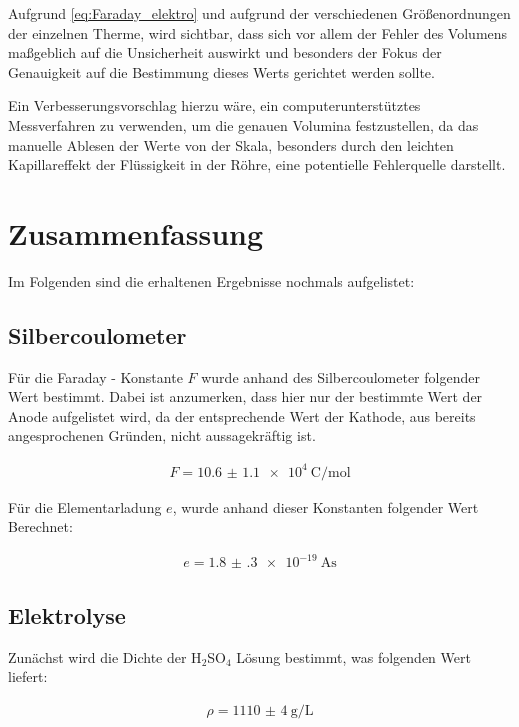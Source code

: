 \documentclass[11pt,ngerman]{scrartcl}
\begin{document}
\vspace{2mm}

Aufgrund \autoref{eq:Faraday_elektro} und aufgrund der verschiedenen Größenordnungen der einzelnen Therme, wird sichtbar, dass sich vor allem der Fehler des Volumens maßgeblich auf die Unsicherheit auswirkt und besonders der Fokus der Genauigkeit auf die Bestimmung dieses Werts gerichtet werden sollte.

Ein Verbesserungsvorschlag hierzu wäre, ein computerunterstütztes Messverfahren zu verwenden, um die genauen Volumina festzustellen, da das manuelle Ablesen der Werte von der Skala, besonders durch den leichten Kapillareffekt der Flüssigkeit in der Röhre, eine potentielle Fehlerquelle darstellt.

\newpage

\section{Zusammenfassung}

Im Folgenden sind die erhaltenen Ergebnisse nochmals aufgelistet:

\subsection{Silbercoulometer}

Für die Faraday - Konstante $F$ wurde anhand des Silbercoulometer folgender Wert bestimmt. Dabei ist anzumerken, dass hier nur der bestimmte Wert der Anode aufgelistet wird, da der entsprechende Wert der Kathode, aus bereits angesprochenen Gründen, nicht aussagekräftig ist.

\begin{align*}
	F = \SI{10.6(11)e4}{\coulomb\per\mol}
\end{align*}

Für die Elementarladung $e$, wurde anhand dieser Konstanten folgender Wert Berechnet:

\begin{align*}
	e = \SI{1.8(3)e-19}{\ampere\second}
\end{align*}

\subsection{Elektrolyse}

Zunächst wird die Dichte der H$_2$SO$_4$ Lösung bestimmt, was folgenden Wert liefert:

\begin{align*}
	\rho = \SI{1110(4)}{\g\per\L}
\end{align*}
\end{document}
